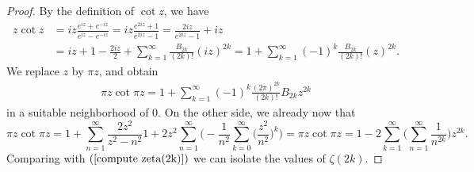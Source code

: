 \begin{proof}
By the definition of $\cot z$, we have
\begin{align*}
z\cot z&=iz\frac{e^{iz}+e^{-iz}}{e^{iz}-e^{-iz}}=iz\frac{e^{2iz}+1}{e^{2iz}-1}=\frac{2iz}{e^{2iz}-1}+iz\\
&=iz+1-\frac{2iz}{2}+\sum_{k=1}^{\infty}\frac{B_{2k}}{(2k)!}(iz)^{2k}=1+\sum_{k=1}^{\infty}(-1)^k\frac{B_{2k}}{(2k)!}(z)^{2k}.
\end{align*}
We replace $z$ by $\pi z$, and obtain
\begin{align}\label{compute zeta(2k)}
\pi z\cot\pi z=1+\sum_{k=1}^{\infty}(-1)^k\frac{(2\pi)^{2k}}{(2k)!}B_{2k}z^{2k}
\end{align}
in a suitable neighborhood of $0$. On the other side, we already now that
\[\pi z\cot\pi z=1+\sum_{n=1}^{\infty}\frac{2z^2}{z^2-n^2}1+2z^2\sum_{n=1}^{\infty}\Big(-\frac{1}{n^2}\sum_{k=0}^{\infty}\Big(\frac{z^2}{n^2}\Big)^k\Big)=\pi z\cot\pi z=1-2\sum_{k=1}^{\infty}\Big(\sum_{n=1}^{\infty}\frac{1}{n^{2k}}\Big)z^{2k}.\]
Comparing with $(\ref{compute zeta(2k)})$ we can isolate the values of $\zeta(2k)$.
\end{proof}
